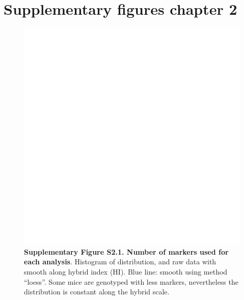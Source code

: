 \section*{Supplementary figures chapter 2}

\begin{figure}[H]
	\centering
	\includegraphics[width=0.9\linewidth,height=\textheight,keepaspectratio]{images/2article1/SupplementaryFigureS1.pdf}
	\captionsetup{labelformat=empty}
	\caption{\textbf{Supplementary Figure S2.1. Number of markers used for each analysis}. Histogram of distribution, and raw data with smooth along hybrid index (HI). Blue line: smooth using method “loess”. Some mice are genotyped with less markers, nevertheless the distribution is constant along the hybrid scale.}
\end{figure}

\newpage

